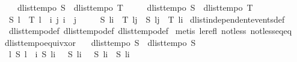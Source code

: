 \begin{isabellebody}
\ \ \ \ dlist{\isacharunderscore}tempo{}\ S\ {\isasymLongrightarrow}\ dlist{\isacharunderscore}tempo{}\ T\ {\isasymLongrightarrow}\isanewline
\ \ \ \ dlist{\isacharunderscore}tempo{}\ S\ {\isasymLongrightarrow}\ dlist{\isacharunderscore}tempo{}\ T\ {\isasymLongrightarrow}\isanewline
\ \ S\ l\ {\isasymand}\ T\ l\ {\isasymlongleftrightarrow}\ {\isacharparenleft}{\isasymexists}i\ j{\isachardot}\ i\ {\isasymle}\ j\ {\isasymand}\isanewline
\ \ \ \ {\isacharparenleft}{\isacharparenleft}S\ {\isacharparenleft}l{\isasymdagger}{\isachardot}{\isachardot}i{\isacharparenright}\ {\isasymand}\ T\ {\isacharparenleft}l{\isasymdagger}j{\isachardot}{\isachardot}{\isacharparenright}{\isacharparenright}\ {\isasymor}\ {\isacharparenleft}S\ {\isacharparenleft}l{\isasymdagger}j{\isachardot}{\isachardot}{\isacharparenright}\ {\isasymand}\ T\ {\isacharparenleft}l{\isasymdagger}{\isachardot}{\isachardot}i{\isacharparenright}{\isacharparenright}{\isacharparenright}{\isacharparenright}{\isachardoublequoteclose}\isanewline
%
\isadelimproof
%
\endisadelimproof
%
\isatagproof
{}\isamarkupfalse%
\ dlist{\isacharunderscore}independent{\isacharunderscore}events{\isacharunderscore}def\ \ \isanewline
\ \ dlist{\isacharunderscore}tempo{}{\isacharunderscore}def\ dlist{\isacharunderscore}tempo{}{\isacharunderscore}def\ dlist{\isacharunderscore}tempo{}{\isacharunderscore}def\isanewline
{}\isamarkupfalse%
\ {\isacharparenleft}metis\ le{\isacharunderscore}refl\ not{\isacharunderscore}less\ not{\isacharunderscore}less{\isacharunderscore}eq{\isacharunderscore}eq{\isacharparenright}%
\endisatagproof
{\isafoldproof}%
%
\isadelimproof
\isanewline
%
\endisadelimproof
\isanewline
{}\isamarkupfalse%
\ dlist{\isacharunderscore}tempo{\isacharunderscore}equiv{\isacharunderscore}xor{\isacharcolon}\ \isanewline
\ \ {\isachardoublequoteopen}dlist{\isacharunderscore}tempo{}\ S\ {\isasymLongrightarrow}\ dlist{\isacharunderscore}tempo{}\ S\ {\isasymLongrightarrow}\ \ \isanewline
\ \ {\isasymforall}l{\isachardot}\ S\ l\ {\isasymlongleftrightarrow}\ {\isacharparenleft}{\isasymforall}i{\isachardot}\ {\isacharparenleft}S\ {\isacharparenleft}l{\isasymdagger}{\isachardot}{\isachardot}i{\isacharparenright}\ {\isasymand}\ {\isasymnot}\ S\ {\isacharparenleft}l{\isasymdagger}i{\isachardot}{\isachardot}{\isacharparenright}{\isacharparenright}\ {\isasymor}\ {\isacharparenleft}{\isasymnot}\ S\ {\isacharparenleft}l{\isasymdagger}{\isachardot}{\isachardot}i{\isacharparenright}\ {\isasymand}\ S\ {\isacharparenleft}l{\isasymdagger}i{\isachardot}{\isachardot}{\isacharparenright}{\isacharparenright}{\isacharparenright}{\isachardoublequoteclose}\isanewline

\end{isabellebody}
